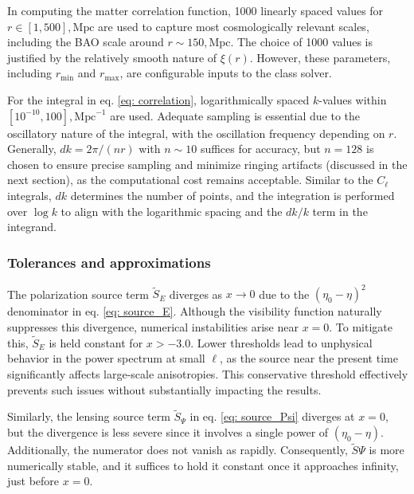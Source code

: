 \documentclass{aa}
\numberwithin{equation}{section}
\numberwithin{table}{section}
\numberwithin{figure}{section}
\begin{document}
In computing the matter correlation function, 1000 linearly spaced values for $r \in [1, 500],\text{Mpc}$ are used to capture most cosmologically relevant scales, including the BAO scale around $r \sim 150,\text{Mpc}$. The choice of 1000 values is justified by the relatively smooth nature of $\xi(r)$. However, these parameters, including $r_{\text{min}}$ and $r_{\text{max}}$, are configurable inputs to the class solver.

For the integral in eq. \eqref{eq: correlation}, logarithmically spaced $k$-values within $[10^{-10}, 100],\text{Mpc}^{-1}$ are used. Adequate sampling is essential due to the oscillatory nature of the integral, with the oscillation frequency depending on $r$. Generally, $dk = 2\pi/(nr)$ with $n \sim 10$ suffices for accuracy, but $n=128$ is chosen to ensure precise sampling and minimize ringing artifacts (discussed in the next section), as the computational cost remains acceptable. Similar to the $C_\ell$ integrals, $dk$ determines the number of points, and the integration is performed over $\log k$ to align with the logarithmic spacing and the $dk/k$ term in the integrand.



\subsubsection{Tolerances and approximations}\label{subsubsec: IV methods approximations}
The polarization source term $\tilde{S}_E$ diverges as $x \to 0$ due to the $(\eta_0 - \eta)^2$ denominator in eq. \eqref{eq: source_E}. Although the visibility function naturally suppresses this divergence, numerical instabilities arise near $x = 0$. To mitigate this, $\tilde{S}_E$ is held constant for $x > -3.0$. Lower thresholds lead to unphysical behavior in the power spectrum at small $\ell$, as the source near the present time significantly affects large-scale anisotropies. This conservative threshold effectively prevents such issues without substantially impacting the results.

Similarly, the lensing source term $\tilde{S}_\Psi$ in eq. \eqref{eq: source_Psi} diverges at $x = 0$, but the divergence is less severe since it involves a single power of $(\eta_0 - \eta)$. Additionally, the numerator does not vanish as rapidly. Consequently, $\tilde{S}\Psi$ is more numerically stable, and it suffices to hold it constant once it approaches infinity, just before $x = 0$.
\end{document}
